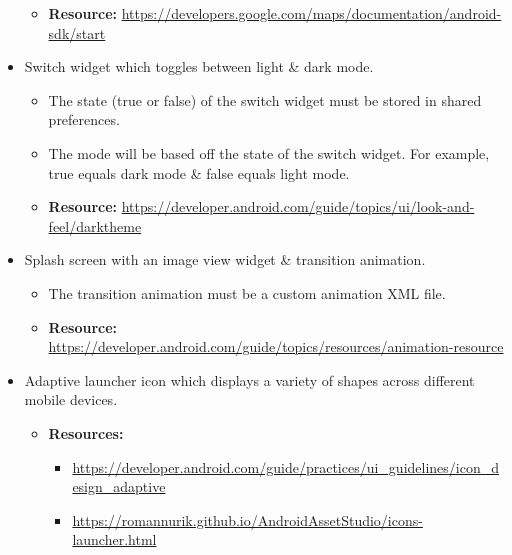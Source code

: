 \documentclass{article}
\begin{document}
\begin{itemize}
    \begin{itemize}
        \item \textbf{Resource:} \footnotesize\href{https://developers.google.com/maps/documentation/android-sdk/start}{https://developers.google.com/maps/documentation/android-sdk/start}
    \end{itemize}
    \item Switch widget which toggles between light \& dark mode. 
    \begin{itemize}
        \item The state (true or false) of the switch widget must be stored in shared preferences.
        \item The mode will be based off the state of the switch widget. For example, true equals dark mode \& false equals light mode.
    \end{itemize}
    \begin{itemize}
        \item \textbf{Resource:} \footnotesize\href{https://developer.android.com/guide/topics/ui/look-and-feel/darktheme}{https://developer.android.com/guide/topics/ui/look-and-feel/darktheme}
    \end{itemize}
    \item Splash screen with an image view widget \& transition animation.
    \begin{itemize}
        \item The transition animation must be a custom animation XML file.
        \item \textbf{Resource:} \footnotesize\href{https://developer.android.com/guide/topics/resources/animation-resource}{https://developer.android.com/guide/topics/resources/animation-resource}
    \end{itemize}
    \item Adaptive launcher icon which displays a variety of shapes across different mobile devices.
    \begin{itemize}
        \item \textbf{Resources:}
        \begin{itemize}
            \item \footnotesize\href{https://developer.android.com/guide/practices/ui\_guidelines/icon\_design\_adaptive}{https://developer.android.com/guide/practices/ui\_guidelines/icon\_design\_adaptive}
            \item \footnotesize\href{https://romannurik.github.io/AndroidAssetStudio/icons-launcher.html}{https://romannurik.github.io/AndroidAssetStudio/icons-launcher.html} 

\end{itemize}
\end{itemize}
\end{itemize}
\end{document}
